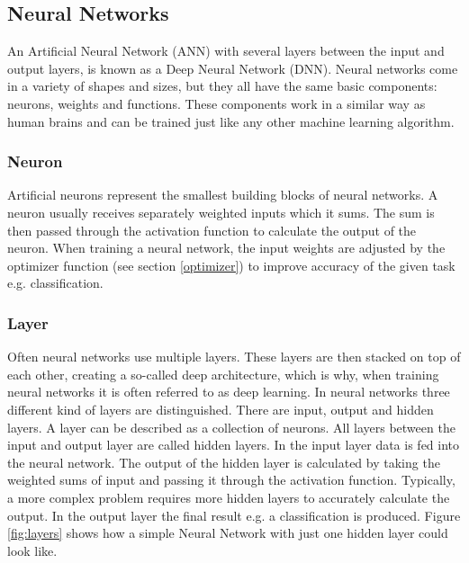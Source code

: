 \subsection{Neural Networks}

An Artificial Neural Network (ANN) with several layers between the input and output layers, is known as a Deep Neural Network (DNN). Neural networks come in a variety of shapes and sizes, but they all have the same basic components: neurons, weights and functions. These components work in a similar way as human brains and can be trained just like any other machine learning algorithm.

\subsubsection{Neuron}
Artificial neurons represent the smallest building blocks of neural networks. A neuron usually receives separately weighted inputs which it sums. The sum is then passed through the activation function to calculate the output of the neuron. When training a neural network, the input weights are adjusted by the optimizer function (see section \ref{optimizer}) to improve accuracy of the given task e.g. classification.

\subsubsection{Layer}
Often neural networks use multiple layers. These layers are then stacked on top of each other, creating a so-called deep architecture, which is why, when training neural networks it is often referred to as deep learning. In neural networks three different kind of layers are distinguished. There are input, output and hidden layers. A layer can be described as a collection of neurons. All layers between the input and output layer are called hidden layers. In the input layer data is fed into the neural network. The output of the hidden layer is calculated by taking the weighted sums of input and passing it through the activation function. Typically, a more complex problem requires more hidden layers to accurately calculate the output. In the output layer the final result e.g. a classification is produced. Figure \ref{fig:layers} shows how a simple Neural Network with just one hidden layer could look like.


